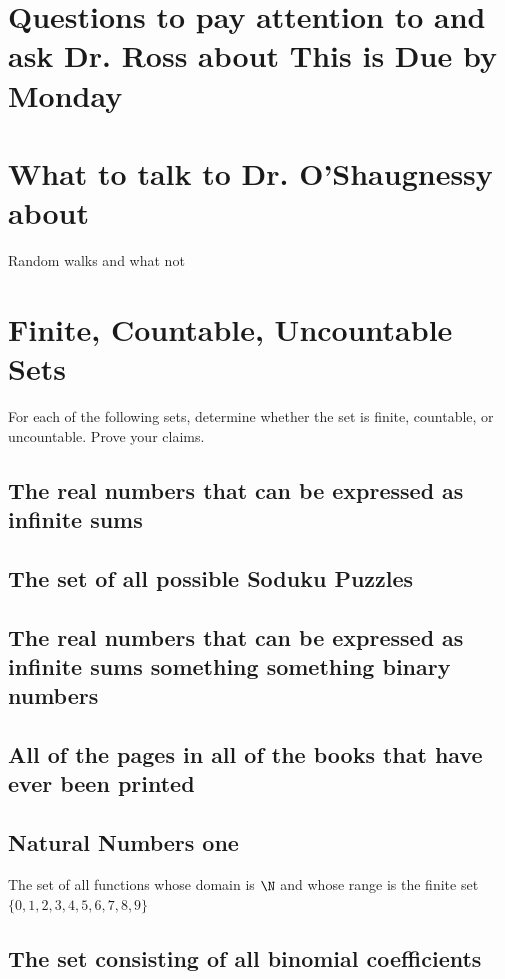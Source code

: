 \section*{Questions to pay attention to and ask Dr. Ross about This is Due by Monday}
\section*{What to talk to Dr. O'Shaugnessy about}
Random walks and what not 
\section*{Finite, Countable, Uncountable Sets}
For each of the following sets, determine whether the set is finite, countable, or uncountable. Prove your claims. \\
\subsection*{The real numbers that can be expressed as infinite sums}

\subsection*{The set of all possible Soduku Puzzles}


\subsection*{The real numbers that can be expressed as infinite sums something something binary numbers}


\subsection*{All of the pages in all of the books that have ever been printed}

\subsection{Natural Numbers one}
The set of all functions whose domain is $\N$ and whose range is the finite set $\{0,1,2,3,4,5,6,7,8,9\}$

\subsection*{The set consisting of all binomial coefficients}

